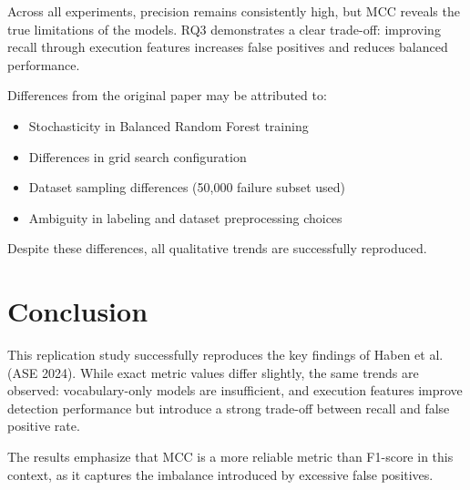 \documentclass[pdflatex,sn-mathphys-num]{sn-jnl}
\begin{document}
Across all experiments, precision remains consistently high, but MCC reveals the true limitations of the models. RQ3 demonstrates a clear trade-off: improving recall through execution features increases false positives and reduces balanced performance.

Differences from the original paper may be attributed to:
\begin{itemize}
\item Stochasticity in Balanced Random Forest training
\item Differences in grid search configuration
\item Dataset sampling differences (50,000 failure subset used)
\item Ambiguity in labeling and dataset preprocessing choices
\end{itemize}

Despite these differences, all qualitative trends are successfully reproduced.

\section{Conclusion}

This replication study successfully reproduces the key findings of Haben et al. (ASE 2024). While exact metric values differ slightly, the same trends are observed: vocabulary-only models are insufficient, and execution features improve detection performance but introduce a strong trade-off between recall and false positive rate.

The results emphasize that MCC is a more reliable metric than F1-score in this context, as it captures the imbalance introduced by excessive false positives.
\end{document}
